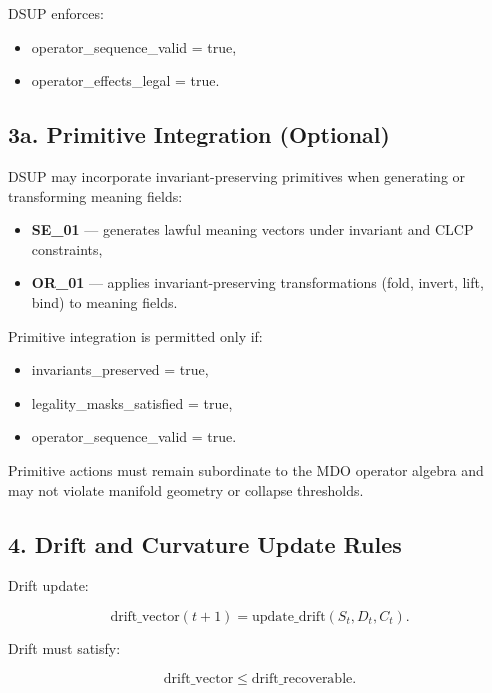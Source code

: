 DSUP enforces:
\begin{itemize}[leftmargin=1.2cm]
    \item operator\_sequence\_valid = true,
    \item operator\_effects\_legal = true.
\end{itemize}

\subsection*{3a. Primitive Integration (Optional)}

DSUP may incorporate invariant-preserving primitives when generating or
transforming meaning fields:

\begin{itemize}[leftmargin=1.2cm]
    \item \textbf{SE\_01} — generates lawful meaning vectors under invariant and
          CLCP constraints,
    \item \textbf{OR\_01} — applies invariant-preserving transformations
          (fold, invert, lift, bind) to meaning fields.
\end{itemize}

Primitive integration is permitted only if:

\begin{itemize}[leftmargin=1.2cm]
    \item invariants\_preserved = true,
    \item legality\_masks\_satisfied = true,
    \item operator\_sequence\_valid = true.
\end{itemize}

Primitive actions must remain subordinate to the MDO operator algebra and may
not violate manifold geometry or collapse thresholds.


\subsection*{4. Drift and Curvature Update Rules}
\label{boot:dsup_drift_curvature}

Drift update:



\[
\text{drift\_vector}(t+1) = \text{update\_drift}(S_t, D_t, C_t).
\]



Drift must satisfy:



\[
\text{drift\_vector} \leq \text{drift\_recoverable}.
\]



